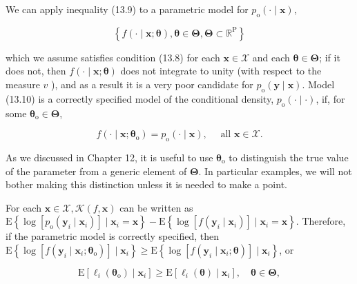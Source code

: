 \documentclass[10pt]{article}
\begin{document}
We can apply inequality (13.9) to a parametric model for $p_{\mathrm{o}}(\cdot \mid \mathbf{x})$,


\begin{equation*}
\left\{f(\cdot \mid \mathbf{x} ; \boldsymbol{\theta}), \boldsymbol{\theta} \in \boldsymbol{\Theta}, \boldsymbol{\Theta} \subset \mathbb{R}^{\mathrm{P}}\right\} \tag{13.10}
\end{equation*}


which we assume satisfies condition (13.8) for each $\mathbf{x} \in \mathscr{X}$ and each $\boldsymbol{\theta} \in \boldsymbol{\Theta}$; if it does not, then $f(\cdot \mid \mathbf{x} ; \boldsymbol{\theta})$ does not integrate to unity (with respect to the measure $v$ ), and as a result it is a very poor candidate for $p_{\mathrm{o}}(\mathbf{y} \mid \mathbf{x})$. Model (13.10) is a correctly specified model of the conditional density, $p_{\mathrm{o}}(\cdot \mid \cdot)$, if, for some $\boldsymbol{\theta}_{\mathrm{o}} \in \boldsymbol{\Theta}$,


\begin{equation*}
f\left(\cdot \mid \mathbf{x} ; \boldsymbol{\theta}_{\mathrm{o}}\right)=p_{\mathrm{o}}(\cdot \mid \mathbf{x}), \quad \text { all } \mathbf{x} \in \mathscr{X} . \tag{13.11}
\end{equation*}


As we discussed in Chapter 12, it is useful to use $\boldsymbol{\theta}_{\mathrm{o}}$ to distinguish the true value of the parameter from a generic element of $\boldsymbol{\Theta}$. In particular examples, we will not bother making this distinction unless it is needed to make a point.

For each $\mathbf{x} \in \mathscr{X}, \mathscr{K}(f, \mathbf{x})$ can be written as $\mathrm{E}\left\{\log \left[p_{\mathrm{o}}\left(\mathbf{y}_{i} \mid \mathbf{x}_{i}\right)\right] \mid \mathbf{x}_{i}=\mathbf{x}\right\}- \mathrm{E}\left\{\log \left[f\left(\mathbf{y}_{i} \mid \mathbf{x}_{i}\right)\right] \mid \mathbf{x}_{i}=\mathbf{x}\right\}$. Therefore, if the parametric model is correctly specified, then $\mathrm{E}\left\{\log \left[f\left(\mathbf{y}_{i} \mid \mathbf{x}_{i} ; \boldsymbol{\theta}_{\mathrm{o}}\right)\right] \mid \mathbf{x}_{i}\right\} \geq \mathrm{E}\left\{\log \left[f\left(\mathbf{y}_{i} \mid \mathbf{x}_{i} ; \boldsymbol{\theta}\right)\right] \mid \mathbf{x}_{i}\right\}$, or


\begin{equation*}
\mathrm{E}\left[\ell_{i}\left(\boldsymbol{\theta}_{\mathrm{o}}\right) \mid \mathbf{x}_{i}\right] \geq \mathrm{E}\left[\ell_{i}(\boldsymbol{\theta}) \mid \mathbf{x}_{i}\right], \quad \boldsymbol{\theta} \in \boldsymbol{\Theta}, \tag{13.12}
\end{equation*}
\end{document}
